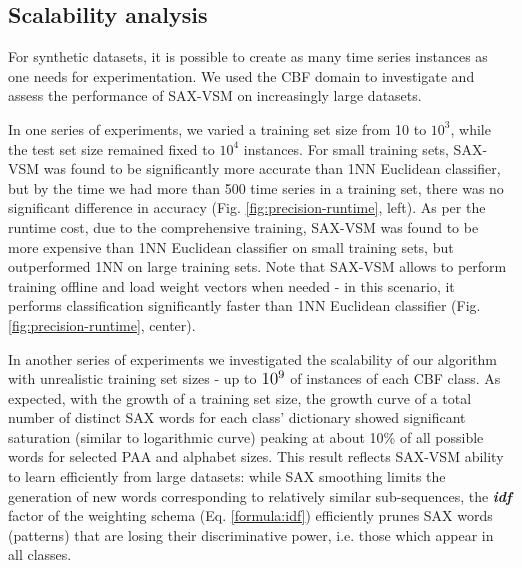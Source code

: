 \documentclass[conference]{IEEEtran}
\begin{document}
\subsection{Scalability analysis} \label{scalability}
For synthetic datasets, it is possible to create as many time series instances as 
one needs for experimentation.
We used the CBF \cite{cbf} domain to investigate and assess the 
performance of SAX-VSM on increasingly large datasets.

In one series of experiments, we varied a training set size from 10 to $10^{3}$, while 
the test set size remained fixed to $10^{4}$ instances. 
For small training sets, SAX-VSM was found to be significantly more accurate than 
1NN Euclidean classifier, but by the time we had more than 500 time series in a training set, 
there was no significant difference in accuracy (Fig. \ref{fig:precision-runtime}, left). 
As per the runtime cost, due to the comprehensive training, SAX-VSM was found to 
be more expensive than 1NN Euclidean classifier on small training sets, 
but outperformed 1NN on large training sets. Note that SAX-VSM allows to perform training 
offline and load weight vectors when needed - in this scenario, it performs classification 
significantly faster than 1NN Euclidean classifier (Fig. \ref{fig:precision-runtime}, center).

In another series of experiments we investigated the scalability of our algorithm with
unrealistic training set sizes - up to $\normalsize{10^{9}}$ of instances of each CBF class.
As expected, with the growth of a training set size, the growth curve of a total number of 
distinct SAX words for each class' dictionary showed significant saturation 
(similar to logarithmic curve) peaking at about 10\% of all possible words for selected 
PAA and alphabet sizes.
This result reflects SAX-VSM ability to learn efficiently from large datasets: 
while SAX smoothing limits the generation of new words corresponding to 
relatively similar sub-sequences, the \textbf{\textit{idf}} factor of the weighting 
schema (Eq. \ref{formula:idf}) efficiently prunes SAX words (patterns) 
that are losing their discriminative power, i.e. those which appear in all classes.

\end{document}
